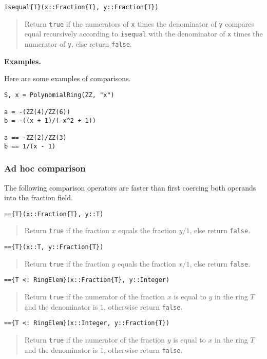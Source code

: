\documentclass[a4paper,10pt]{article}
\newcommand{\code}{\lstinline}
\newcommand{\desc}[1]{\vspace{-3mm}\begin{quote}#1\end{quote}}
\begin{document}
\begin{lstlisting}
isequal{T}(x::Fraction{T}, y::Fraction{T})
\end{lstlisting}

\desc{Return \code{true} if the numerators of \code{x} times the denominator
of \code{y} compares equal recursively according to \code{isequal} with the
denominator of \code{x} times the numerator of \code{y}, else return
\code{false}.}

\textbf{Examples.}

Here are some examples of comparisons.

\begin{lstlisting}
S, x = PolynomialRing(ZZ, "x")

a = -(ZZ(4)/ZZ(6))
b = -((x + 1)/(-x^2 + 1))

a == -ZZ(2)/ZZ(3)
b == 1/(x - 1)
\end{lstlisting}

\subsubsection{Ad hoc comparison}

The following comparison operators are faster than first coercing both
operands into the fraction field.

\begin{lstlisting}
=={T}(x::Fraction{T}, y::T)
\end{lstlisting}

\desc{Return \code{true} if the fraction $x$ equals the fraction $y/1$, else
return \code{false}.}

\begin{lstlisting}
=={T}(x::T, y::Fraction{T})
\end{lstlisting}

\desc{Return \code{true} if the fraction $y$ equals the fraction $x/1$, else
return \code{false}.}

\begin{lstlisting}
=={T <: RingElem}(x::Fraction{T}, y::Integer)
\end{lstlisting}

\desc{Return \code{true} if the numerator of the fraction $x$ is equal to $y$
in the ring $T$ and the denominator is $1$, otherwise return \code{false}.}

\begin{lstlisting}
=={T <: RingElem}(x::Integer, y::Fraction{T})
\end{lstlisting}

\desc{Return \code{true} if the numerator of the fraction $y$ is equal to $x$
in the ring $T$ and the denominator is $1$, otherwise return \code{false}.}
\end{document}
